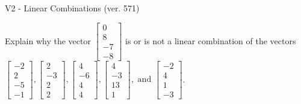 \begin{exercise}
  \begin{exerciseTitle}V2 - Linear Combinations (ver. 571)\end{exerciseTitle}
  \begin{exerciseStatement}
    Explain why the vector \(\left[\begin{array}{c}
0 \\
8 \\
-7 \\
-8
\end{array}\right]\)  is or is not a linear 
	combination of the vectors \(\left[\begin{array}{c}
-2 \\
2 \\
-5 \\
-1
\end{array}\right] , \left[\begin{array}{c}
2 \\
-3 \\
2 \\
2
\end{array}\right] , \left[\begin{array}{c}
4 \\
-6 \\
4 \\
4
\end{array}\right] , \left[\begin{array}{c}
4 \\
-3 \\
13 \\
1
\end{array}\right] , \text{ and } \left[\begin{array}{c}
-2 \\
4 \\
1 \\
-3
\end{array}\right]\).
	



\end{exerciseStatement}
\end{exercise}
